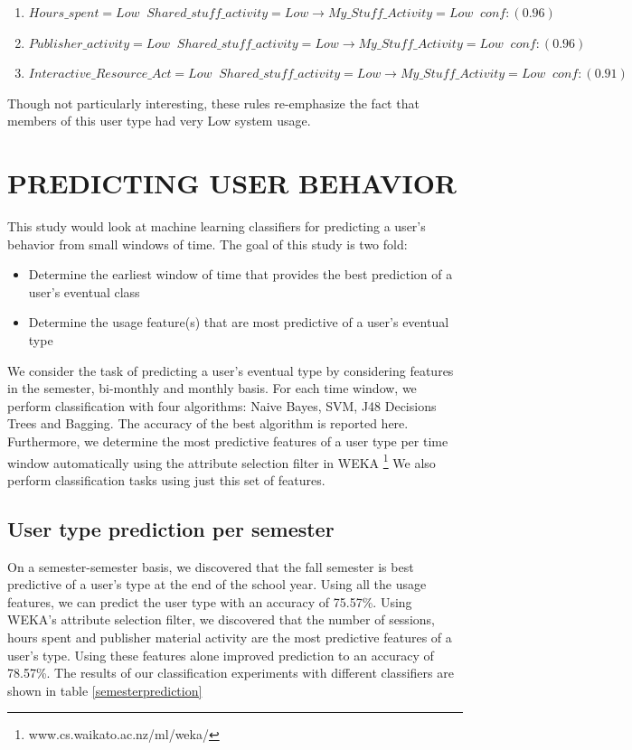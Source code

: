 \documentclass{acm_proc_article-sp}
\begin{document}
\begin{enumerate}

\item $Hours\_spent=Low \;\; Shared\_stuff\_activity =Low  \longrightarrow My\_Stuff\_Activity =Low  \;\;    conf:(0.96)$
\item $Publisher\_activity=Low \;\; Shared\_stuff\_activity=Low  \longrightarrow My\_Stuff\_Activity = Low  \;\;  conf:(0.96)$
\item $Interactive\_Resource\_Act=Low  \;\;Shared\_stuff\_activity=Low  \longrightarrow My\_Stuff\_Activity=Low  \;\; conf:(0.91)$
\end{enumerate}
Though not particularly interesting, these rules re-emphasize the fact that members of this user type had very Low system usage.

 \section {PREDICTING USER BEHAVIOR}
This study would look at machine learning classifiers for predicting a user's behavior from small windows of time. The goal of this study is two fold:
\begin{itemize}
\item Determine the earliest window of time that provides the best prediction of a user's eventual class
\item Determine the usage feature(s) that are most predictive of a user's eventual type
\end{itemize}

We consider the task of predicting a user's eventual type by considering features in the semester, bi-monthly and monthly basis.
For each time window, we perform  classification with four algorithms: Naive Bayes, SVM, J48 Decisions Trees and Bagging. The accuracy of the best algorithm is reported here. Furthermore, we determine the most predictive features of a user type per time window automatically using the attribute selection filter in WEKA \footnote{www.cs.waikato.ac.nz/ml/weka/} We also perform classification tasks using just this set of features.
\subsection{User type prediction per semester}
On a semester-semester basis, we discovered that the fall semester is best predictive of a user's type at the end of the school year. Using all the usage features, we can predict the user type with an accuracy of 75.57\%. Using WEKA's attribute selection filter, we discovered that the number of sessions, hours spent and publisher material activity are the most predictive features of a user's type. Using these features alone improved prediction to an accuracy of 78.57\%. The results of our classification experiments with different classifiers are shown in table \ref{semesterprediction}
\end{document}
